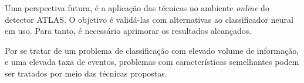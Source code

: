 Uma perspectiva futura, é a aplicação das técnicas no ambiente \textit{online} do detector ATLAS. O objetivo é  validá-las com alternativas ao classificador neural em uso. Para tanto, é necessário aprimorar os resultados alcançados.


Por se tratar de um problema de classificação com elevado volume de informação, e uma elevada taxa de eventos, problemas com características semelhantes podem ser tratados por meio das técnicas propostas. %